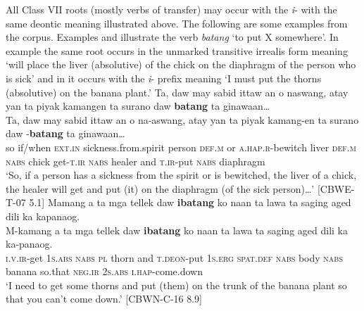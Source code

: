 All Class VII roots (mostly verbs of transfer) may occur with the \textit{i}{}- with the same deontic meaning illustrated above. The following are some examples from the corpus. Examples  and  illustrate the verb \textit{batang} ‘to put X somewhere’. In example  the same root occurs in the unmarked transitive irrealis form meaning ‘will place the liver (absolutive) of the chick on the diaphragm of the person who is sick’ and in  it occurs with the \textit{i}{}- prefix meaning ‘I must put the thorns (absolutive) on the banana plant.’
\ea
\label{bkm:Ref447005121}
Ta,  daw  may  sabid  ittaw  an o naswang, atay  yan  ta  piyak  kamangen  ta  surano  daw  \textbf{batang} ta  ginawaan… \\\smallskip
 \gll Ta,  daw  may  sabid  ittaw  an o na-aswang,\footnotemark{} atay  yan  ta  piyak  kamang-en  ta  surano  daw  \emptyset{}-\textbf{batang} ta  ginawaan… \\
so  if/when  \textsc{ext.in}  sickness.from.spirit  person  \textsc{def.m}  or 
  \textsc{a.hap.r}-bewitch
liver  \textsc{def.m}  \textsc{nabs}  chick  get-\textsc{t.ir}  \textsc{nabs}  healer  and
\textsc{t.ir}-put \textsc{nabs}  diaphragm \\
\glt `So, if a person has a sickness from the spirit or is bewitched, the liver of a chick, the healer will get and put (it) on the diaphragm (of the sick person)…’ [CBWE-T-07 5.1]
\z
\ea
\label{bkm:Ref119941404}
Mamang  a  ta  mga  tellek  daw  \textbf{ibatang}  ko  naan  ta lawa  ta  saging  aged  dili  ka  kapanaog. \\\smallskip
 \gll M-kamang  a  ta  mga  tellek  daw  \textbf{ibatang}  ko  naan  ta lawa  ta  saging  aged  dili  ka  ka-panaog. \\
\textsc{i.v.ir}-get  1\textsc{s.abs}  \textsc{nabs}  \textsc{pl}  thorn  and  \textsc{t.deon}-put  1\textsc{s.erg}  \textsc{spat.def} \textsc{nabs} body  \textsc{nabs}  banana  so.that  \textsc{neg.ir}  2\textsc{s.abs}  \textsc{i.hap}-come.down \\
\glt `I need to get some thorns and put (them) on the trunk of the banana plant so that you can’t come down.’ [CBWN-C-16 8.9]
\z

